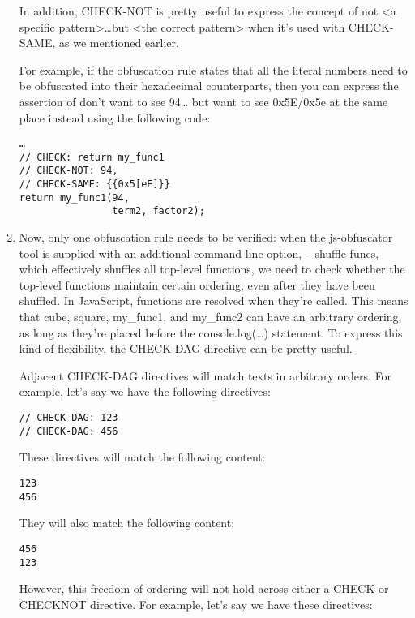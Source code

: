 \begin{enumerate}
In addition, CHECK-NOT is pretty useful to express the concept of not <a specific pattern>…but <the correct pattern> when it's used with CHECK-SAME, as we mentioned earlier.

For example, if the obfuscation rule states that all the literal numbers need to be obfuscated into their hexadecimal counterparts, then you can express the assertion of don't want to see 94… but want to see 0x5E/0x5e at the same place instead using the following code:

\begin{lstlisting}[style=styleJavaScript]
…
// CHECK: return my_func1
// CHECK-NOT: 94,
// CHECK-SAME: {{0x5[eE]}}
return my_func1(94,
				term2, factor2);
\end{lstlisting}

\item Now, only one obfuscation rule needs to be verified: when the js-obfuscator tool is supplied with an additional command-line option, -\,-shuffle-funcs, which effectively shuffles all top-level functions, we need to check whether the top-level functions maintain certain ordering, even after they have been shuffled. In JavaScript, functions are resolved when they're called. This means that cube, square, my\_func1, and my\_func2 can have an arbitrary ordering, as long as they're placed before the console.log(…) statement. To express this kind of flexibility, the CHECK-DAG directive can be pretty useful.

Adjacent CHECK-DAG directives will match texts in arbitrary orders. For example, let's say we have the following directives:

\begin{lstlisting}[style=styleJavaScript]
// CHECK-DAG: 123
// CHECK-DAG: 456
\end{lstlisting}

These directives will match the following content:

\begin{lstlisting}[style=styleJavaScript]
123
456
\end{lstlisting}

They will also match the following content:

\begin{lstlisting}[style=styleJavaScript]
456
123
\end{lstlisting}

However, this freedom of ordering will not hold across either a CHECK or CHECKNOT directive. For example, let's say we have these directives:


\end{enumerate}
